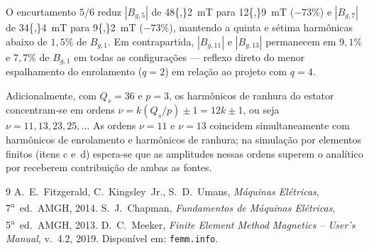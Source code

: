 \documentclass[12pt,a4paper]{article}
\begin{document}
O encurtamento $5/6$ reduz $|B_{g,5}|$ de \SI{48{,}2}{mT} para \SI{12{,}9}{mT}
($-73\%$) e $|B_{g,7}|$ de \SI{34{,}4}{mT} para \SI{9{,}2}{mT} ($-73\%$),
mantendo a quinta e sétima harmônicas abaixo de $1{,}5\%$ de $B_{g,1}$.
Em contrapartida, $|B_{g,11}|$ e $|B_{g,13}|$ permanecem em $9{,}1\%$ e $7{,}7\%$
de $B_{g,1}$ em todas as configurações --- reflexo direto do menor espalhamento
do enrolamento ($q{=}2$) em relação ao projeto com $q{=}4$.

Adicionalmente, com $Q_s{=}36$ e $p{=}3$, os harmônicos de ranhura do estator
concentram-se em ordens $\nu{=}k(Q_s/p){\pm}1{=}12k{\pm}1$, ou seja
$\nu{=}11,13,23,25,\ldots$ As ordens $\nu{=}11$ e $\nu{=}13$ coincidem
simultaneamente com harmônicos de enrolamento e harmônicos de ranhura;
na simulação por elementos finitos (itens c e~d) espera-se que as amplitudes
nessas ordens superem o analítico por receberem contribuição de ambas as fontes.

\begin{thebibliography}{9}\small\vspace{-2pt}
  A.~E.~Fitzgerald, C.~Kingsley~Jr., S.~D.~Umans,
  \textit{Máquinas Elétricas}, 7\textsuperscript{a}~ed.\ AMGH, 2014.
  S.~J.~Chapman, \textit{Fundamentos de Máquinas Elétricas},
  5\textsuperscript{a}~ed.\ AMGH, 2013.
  D.~C.~Meeker,
  \textit{Finite Element Method Magnetics -- User's Manual}, v.~4.2, 2019.
  Disponível em: \texttt{femm.info}.
\end{thebibliography}
\end{document}
